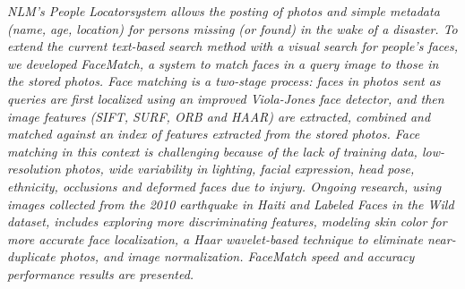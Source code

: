 
\begin{xpsectionbox}{}{}

\emph{\color{blue} NLM's People Locator\texttrademark system allows the posting of photos and simple metadata (name, age, location) for persons missing (or found) in the wake of a disaster. To extend the current text-based search method with a visual search for people's faces, we developed FaceMatch, a system to match faces in a query image to those in the stored photos.
	Face matching is a two-stage process: faces in photos sent as queries are first localized using an improved Viola-Jones face detector, and then image features (SIFT, SURF, ORB and HAAR) are extracted, combined and matched against an index of features extracted from the stored photos. 
Face matching in this context is challenging because of the lack of training data, low-resolution photos, wide variability in lighting, facial expression, head pose, ethnicity, occlusions and deformed faces due to injury.
	Ongoing research, using images collected from the 2010 earthquake in Haiti and Labeled Faces in the Wild dataset, includes exploring more discriminating features, modeling skin color for more accurate face localization, a Haar wavelet-based technique to eliminate near-duplicate photos, and image normalization. FaceMatch speed and accuracy performance results are presented.}

\end{xpsectionbox}

